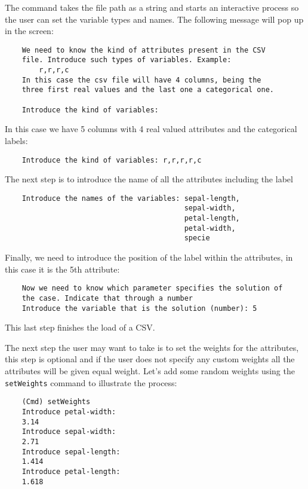 \documentclass[11pt]{article}
\begin{document}
The command takes the file path as a string and starts an interactive process so the user can set the variable types and names. The following message will pop up in the screen:
\begin{verbatim}
    We need to know the kind of attributes present in the CSV 
    file. Introduce such types of variables. Example:
        r,r,r,c
    In this case the csv file will have 4 columns, being the 
    three first real values and the last one a categorical one.

    Introduce the kind of variables:
\end{verbatim}

In this case we have 5 columns with 4 real valued attributes and the categorical labels:
\begin{verbatim}
    Introduce the kind of variables: r,r,r,r,c
\end{verbatim}

The next step is to introduce the name of all the attributes including the label
\begin{verbatim}
    Introduce the names of the variables: sepal-length, 
                                          sepal-width, 
                                          petal-length, 
                                          petal-width, 
                                          specie
\end{verbatim}

Finally, we need to introduce the position of the label within the attributes, in this case it is the 5th attribute:
\begin{verbatim}
    Now we need to know which parameter specifies the solution of 
    the case. Indicate that through a number
    Introduce the variable that is the solution (number): 5
\end{verbatim}

This last step finishes the load of a CSV. 

The next step the user may want to take is to set the weights for the attributes, this step is optional and if the user does not specify any custom weights all the attributes will be given equal weight. Let's add some random weights using the \texttt{setWeights} command to illustrate the process:
\begin{verbatim}
    (Cmd) setWeights
    Introduce petal-width:
    3.14
    Introduce sepal-width:
    2.71
    Introduce sepal-length:
    1.414
    Introduce petal-length:
    1.618
\end{verbatim}
\end{document}
